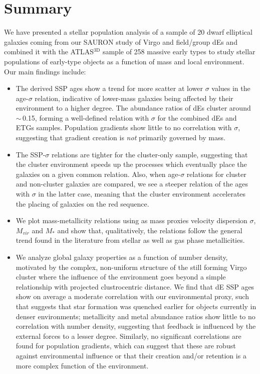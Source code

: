 \documentclass[useAMS,usenatbib]{mn2e}
\newcommand{\sig}{$\sigma$}
\newcommand{\atlas}{ATLAS$^{\mathrm{3D}}$}
\begin{document}
\section{Summary}
We have presented a stellar population analysis of a sample of 20 dwarf elliptical galaxies coming from our SAURON study of Virgo and field/group dEs and combined it with the {\atlas} sample of 258 massive early types to study stellar populations of early-type objects as a function of mass and local environment. Our main findings include:
\begin{itemize}
\item The derived SSP ages show a trend for more scatter at lower {\sig} values in the age-{\sig} relation, indicative of lower-mass galaxies being affected by their environment to a higher degree. The abundance ratios of dEs cluster around $\sim$\,0.15, forming a well-defined relation with {\sig} for the combined dEs and ETGs samples. Population gradients show little to no correlation with {\sig}, suggesting that gradient creation is \textit{not} primarily governed by mass.
\item The SSP-{\sig} relations are tighter for the cluster-only sample, suggesting that the cluster environment speeds up the processes which eventually place the galaxies on a given common relation. Also, when age-{\sig} relations for cluster and non-cluster galaxies are compared, we see a steeper relation of the ages with {\sig} in the latter case, meaning that the cluster environment accelerates the placing of galaxies on the red sequence.
\item We plot mass-metallicity relations using as mass proxies velocity dispersion {\sig}, $M_{vir}$ and $M_{*}$ and show that, qualitatively, the relations follow the general trend found in the literature from stellar as well as gas phase metallicities.
\item We analyze global galaxy properties as a function of number density, motivated by the complex, non-uniform structure of the still forming Virgo cluster where the influence of the environment goes beyond a simple relationship with projected clustrocentric distance. We find that dE SSP ages show on average a moderate correlation with our environmental proxy, such that suggests that star formation was quenched earlier for objects currently in denser environments; metallicity and metal abundance ratios show little to no correlation with number density, suggesting that feedback is influenced by the external forces to a lesser degree. Similarly, no significant correlations are found for population gradients, which can suggest that these are robust against environmental influence or that their creation and/or retention is a more complex function of the environment. 

\end{itemize}
\end{document}

